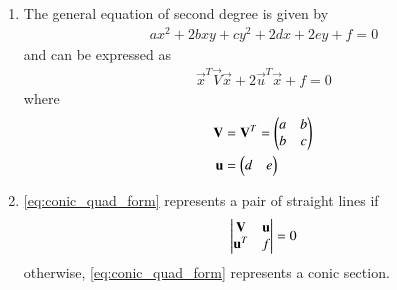 \renewcommand{\theequation}{\theenumi}
\begin{enumerate}[label=\thesection.\arabic*.,ref=\thesection.\theenumi]
\item The general equation of second degree is given by
\begin{align}
ax^2+2bxy+cy^2+2dx+2ey+f=0
\end{align}
and can be expressed as
\begin{align}
\label{eq:conic_quad_form}
\vec{x}^T\vec{V}\vec{x}+2\vec{u}^T\vec{x}+f=0
\end{align}
%
where
\begin{align}
\mathbf{V} &= \mathbf{V}^T = \begin{pmatrix}a & b \\ b & c\end{pmatrix}
\\
\mathbf{u} &= \begin{pmatrix}d & e\end{pmatrix}
\end{align}

\item \eqref{eq:conic_quad_form} represents a pair of straight lines if
\begin{align}
\begin{vmatrix}
\mathbf{V}&\mathbf{u}
\\
\mathbf{u}^T&f
\end{vmatrix}
= 0
\label{eq:quad_forms_pair_det}
\end{align}
%
otherwise, \eqref{eq:conic_quad_form} represents a conic section.


\end{enumerate}

